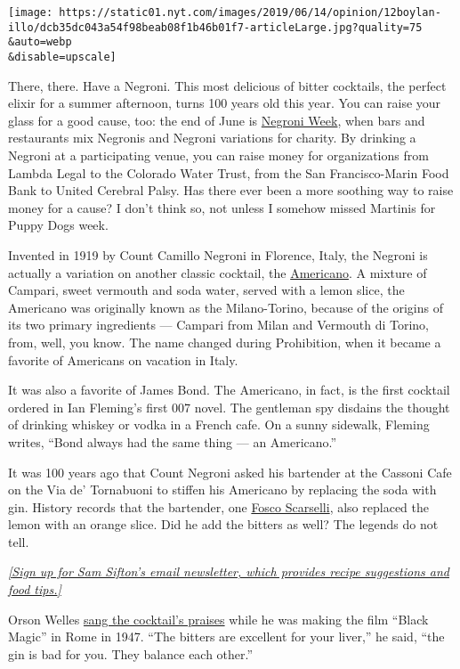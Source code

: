 \texttt{[image: https://static01.nyt.com/images/2019/06/14/opinion/12boylan-illo/dcb35dc043a54f98beab08f1b46b01f7-articleLarge.jpg?quality=75\\\&auto=webp\\\&disable=upscale]}

There, there. Have a Negroni. This most delicious of bitter cocktails,
the perfect elixir for a summer afternoon, turns 100 years old this
year. You can raise your glass for a good cause, too: the end of June is
\href{https://negroniweek.com/}{Negroni Week}, when bars and restaurants
mix Negronis and Negroni variations for charity. By drinking a Negroni
at a participating venue, you can raise money for organizations from
Lambda Legal to the Colorado Water Trust, from the San Francisco-Marin
Food Bank to United Cerebral Palsy. Has there ever been a more soothing
way to raise money for a cause? I don't think so, not unless I somehow
missed Martinis for Puppy Dogs week.

Invented in 1919 by Count Camillo Negroni in Florence, Italy, the
Negroni is actually a variation on another classic cocktail, the
\href{https://www.thespruceeats.com/americano-cocktail-recipe-759279}{Americano}.
A mixture of Campari, sweet vermouth and soda water, served with a lemon
slice, the Americano was originally known as the Milano-Torino, because
of the origins of its two primary ingredients --- Campari from Milan and
Vermouth di Torino, from, well, you know. The name changed during
Prohibition, when it became a favorite of Americans on vacation in
Italy.

It was also a favorite of James Bond. The Americano, in fact, is the
first cocktail ordered in Ian Fleming's first 007 novel. The gentleman
spy disdains the thought of drinking whiskey or vodka in a French cafe.
On a sunny sidewalk, Fleming writes, ``Bond always had the same thing
--- an Americano.''

It was 100 years ago that Count Negroni asked his bartender at the
Cassoni Cafe on the Via de' Tornabuoni to stiffen his Americano by
replacing the soda with gin. History records that the bartender, one
\href{https://www.diffordsguide.com/people/51630/bartender/fosco-scarselli}{Fosco
Scarselli}, also replaced the lemon with an orange slice. Did he add the
bitters as well? The legends do not tell.

\href{https://www.nytimes.com/newsletters/cooking}{\emph{{[}Sign up for
Sam Sifton's email newsletter, which provides recipe suggestions and
food tips.{]}}}

Orson Welles
\href{http://www.ahistoryofdrinking.com/wordpress/orson-welles-and-the-negroni/}{sang
the cocktail's praises} while he was making the film ``Black Magic'' in
Rome in 1947. ``The bitters are excellent for your liver,'' he said,
``the gin is bad for you. They balance each other.''

